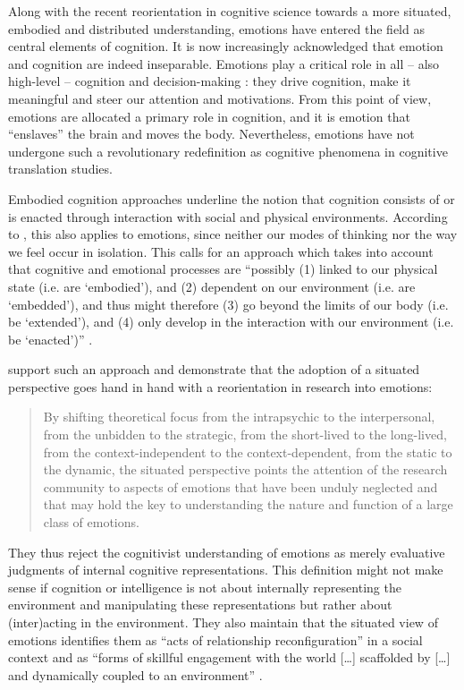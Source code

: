\documentclass[output=paper]{langscibook}
\begin{document}
Along with the recent reorientation in cognitive science towards a more situated, embodied and distributed understanding, emotions have entered the field as central elements of cognition. It is now increasingly acknowledged that emotion and cognition are indeed inseparable. Emotions play a critical role in all -- also high-level -- cognition and decision-making \citep{Damasio1994, Damasio1999}: they drive cognition, make it meaningful and steer our attention and motivations. From this point of view, emotions are allocated a primary role in cognition, and it is emotion that “enslaves” the brain and moves the body. Nevertheless, emotions have not undergone such a revolutionary redefinition as cognitive phenomena in cognitive translation studies.

Embodied cognition approaches underline the notion that cognition consists of or is enacted through interaction with social and physical environments. According to \citet[67]{Stephan2014}, this also applies to emotions, since neither our modes of thinking nor the way we feel occur in isolation. This calls for an approach which takes into account that cognitive and emotional processes are “possibly (1) linked to our physical state (i.e. are ‘embodied’), and (2) dependent on our environment (i.e. are ‘embedded’), and thus might therefore (3) go beyond the limits of our body (i.e. be ‘extended’), and (4) only develop in the interaction with our environment (i.e. be ‘enacted’)” \citep[285; translated by the authors]{Wilutzky2011}.

\citet[438]{Griffiths2009} support such an approach and demonstrate that the adoption of a situated perspective goes hand in hand with a reorientation in research into emotions:

\begin{quote}\sloppy
    By shifting theoretical focus from the intrapsychic to the interpersonal, from the unbidden to the strategic, from the short-lived to the long-lived, from the context-independent to the context-dependent, from the static to the dynamic, the situated perspective points the attention of the research community to aspects of emotions that have been unduly neglected and that may hold the key to understanding the nature and function of a large class of emotions. \citep[448f]{Griffiths2009}
\end{quote}

\noindent
They thus reject the cognitivist understanding of emotions as merely evaluative judgments of internal cognitive representations. This definition might not make sense if cognition or intelligence is not about internally representing the environment and manipulating these representations but rather about (inter)acting in the environment. They also maintain that the situated view of emotions identifies them as “acts of relationship reconfiguration” in a social context and as “forms of skillful engagement with the world […] scaffolded by […] and dynamically coupled to an environment” \citep[438]{Griffiths2009}.
\end{document}
